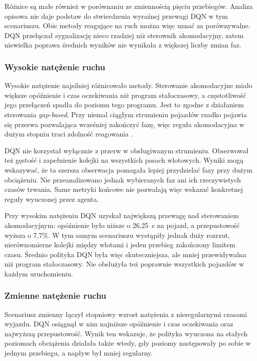 Różnice są małe również w porównaniu ze zmiennością pięciu przebiegów. Analiza opisowa nie daje podstaw do stwierdzenia wyraźnej przewagi DQN w tym scenariuszu. Obie metody reagujące na ruch można więc uznać za porównywalne. DQN przełączał sygnalizację nieco rzadziej niż sterownik akomodacyjny, zatem niewielka poprawa średnich wyników nie wynikała z większej liczby zmian faz.

\subsubsection{Wysokie natężenie ruchu}

Wysokie natężenie najsilniej różnicowało metody. Sterowanie akomodacyjne miało większe opóźnienie i czas oczekiwania niż program stałoczasowy, a częstotliwość jego przełączeń spadła do poziomu tego programu. Jest to zgodne z działaniem sterowania \textit{gap-based}. Przy niemal ciągłym strumieniu pojazdów rzadko pojawia się przerwa pozwalająca wcześniej zakończyć fazę, więc reguła akomodacyjna w dużym stopniu traci zdolność reagowania \cite{NAP22097,sumoTrafficLights}.

DQN nie korzystał wyłącznie z przerw w obsługiwanym strumieniu. Obserwował też gęstość i zapełnienie kolejki na wszystkich pasach wlotowych. Wyniki mogą wskazywać, że ta szersza obserwacja pomagała lepiej przydzielać fazy przy dużym obciążeniu. Nie przeanalizowano jednak wybieranych faz ani ich rzeczywistych czasów trwania. Same metryki końcowe nie pozwalają więc wskazać konkretnej reguły wyuczonej przez agenta.

Przy wysokim natężeniu DQN uzyskał największą przewagę nad sterowaniem akomodacyjnym: opóźnienie było niższe o 26,25~s na pojazd, a przepustowość wyższa o 7,7\%. W tym samym scenariuszu wystąpiły jednak duży rozrzut, nierównomierne kolejki między wlotami i jeden przebieg zakończony limitem czasu. Średnio polityka DQN była więc skuteczniejsza, ale mniej przewidywalna niż program stałoczasowy. Nie obsłużyła też poprawnie wszystkich pojazdów w każdym uruchomieniu.

\subsubsection{Zmienne natężenie ruchu}

Scenariusz zmienny łączył stopniowy wzrost natężenia z nieregularnymi czasami wyjazdu. DQN osiągnął w nim najniższe opóźnienie i czas oczekiwania oraz najwyższą przepustowość. Wynik ten wskazuje, że polityka wyuczona na stałych poziomach obciążenia działała także wtedy, gdy poziomy następowały po sobie w jednym przebiegu, a napływ był mniej regularny.

